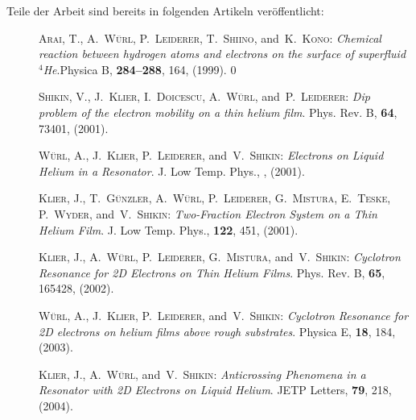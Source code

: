 Teile der Arbeit sind bereits in folgenden Artikeln veröffentlicht:

\selectlanguage{\english}
\begin{description}
	\item[\cite{Ara99}] \textsc{Arai, T.}, \textsc{A.~W{\"u}rl}, \textsc{P.~Leiderer}, \textsc{T.~Shiino}, and\ \textsc{K.~Kono}: {\em {C}hemical reaction between hydrogen atoms and electrons on the surface of superfluid {$^4$}{H}e}.\newblock Physica B, \textbf{284--288}, 164, (1999).
0
	\item[\cite{Shi01}] \textsc{Shikin, V.}, \textsc{J.~Klier}, \textsc{I.~Doicescu}, \textsc{A.~W{\"u}rl}, and\ \textsc{P.~Leiderer}: {\em {D}ip problem of the electron mobility on a thin helium film}. \newblock Phys. Rev. B, \textbf{64}, 73401, (2001).
	
	\item[\cite{Wue01}] \textsc{W{\"u}rl, A.}, \textsc{J.~Klier}, \textsc{P.~Leiderer}, and\ \textsc{V.~Shikin}: {\em {E}lectrons on {L}iquid {H}elium in a {R}esonator}. \newblock J. Low Temp. Phys., \textbf{}, (2001).
	
	\item[\cite{Kli01}] \textsc{Klier, J.}, \textsc{T.~G{\"u}nzler}, \textsc{A.~W{\"u}rl}, \textsc{P.~Leiderer}, \textsc{G.~Mistura}, \textsc{E.~Teske}, \textsc{P.~Wyder}, and\ \textsc{V.~Shikin}: {\em {T}wo-{F}raction {E}lectron {S}ystem on a {T}hin {H}elium {F}ilm}. \newblock J. Low Temp. Phys., \textbf{122}, 451, (2001).
	
	\item[\cite{Kli02}] \textsc{Klier, J.}, \textsc{A.~W{\"u}rl}, \textsc{P.~Leiderer}, \textsc{G.~Mistura}, and\ \textsc{V.~Shikin}: {\em {C}yclotron {R}esonance for 2{D} {E}lectrons on {T}hin {H}elium {F}ilms}. \newblock Phys. Rev. B, \textbf{65}, 165428, (2002).
	
	\item[\cite{Wue03}] \textsc{W{\"u}rl, A.}, \textsc{J.~Klier}, \textsc{P.~Leiderer}, and\ \textsc{V.~Shikin}: {\em {C}yclotron {R}esonance for 2{D} electrons on helium films above rough substrates}. \newblock Physica E, \textbf{18}, 184, (2003).
	
	\item[\cite{Kli04}] \textsc{Klier, J.}, \textsc{A.~W{\"u}rl}, and\ \textsc{V.~Shikin}: {\em {A}nticrossing {P}henomena in a {R}esonator with 2{D} {E}lectrons on {L}iquid {H}elium}. \newblock JETP Letters, \textbf{79}, 218, (2004).
\end{description}
\selectlanguage{\ngerman}

